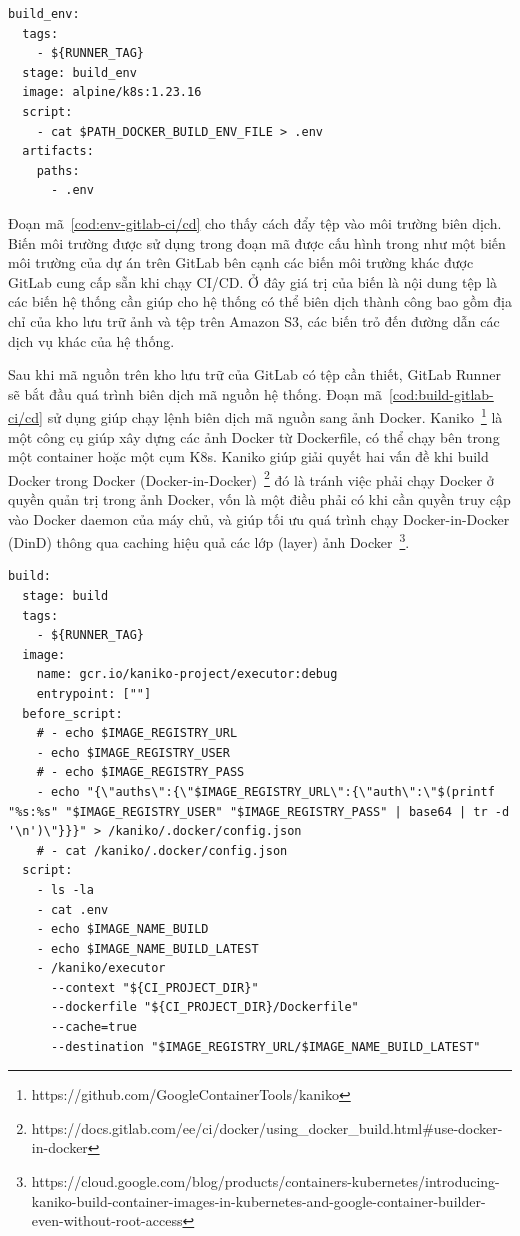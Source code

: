\begin{lstlisting}[style=yaml, caption={Đoạn mã cấu hình cài đặt biến môi trường cho GitLab Runner.}, label={cod:env-gitlab-ci/cd},  captionpos=b]
build_env:
  tags:
    - ${RUNNER_TAG}
  stage: build_env
  image: alpine/k8s:1.23.16
  script:
    - cat $PATH_DOCKER_BUILD_ENV_FILE > .env
  artifacts:
    paths:
      - .env
\end{lstlisting}

Đoạn mã~\ref{cod:env-gitlab-ci/cd} cho thấy cách đẩy tệp  vào môi trường biên dịch.
Biến môi trường  được sử dụng trong đoạn mã được cấu hình trong như một biến môi trường của dự án trên GitLab bên cạnh các biến môi trường khác được GitLab cung cấp sẵn khi chạy CI/CD.
Ở đây giá trị của biến là nội dung tệp  là các biến hệ thống cần giúp cho hệ thống có thể biên dịch thành công bao gồm địa chỉ của kho lưu trữ ảnh và tệp trên Amazon S3, các biến trỏ đến đường dẫn các dịch vụ khác của hệ thống.

Sau khi mã nguồn trên kho lưu trữ của GitLab có tệp  cần thiết, GitLab Runner sẽ bắt đầu quá trình biên dịch mã nguồn hệ thống. Đoạn mã~\ref{cod:build-gitlab-ci/cd} sử dụng  giúp chạy lệnh biên dịch mã nguồn sang ảnh Docker.
Kaniko~\footnote{https://github.com/GoogleContainerTools/kaniko} là một công cụ giúp xây dựng các ảnh Docker từ Dockerfile, có thể chạy bên trong một container hoặc một cụm K8s.
Kaniko giúp giải quyết hai vấn đề khi build Docker trong Docker (Docker-in-Docker)~\footnote{https://docs.gitlab.com/ee/ci/docker/using\_docker\_build.html\#use-docker-in-docker} đó là tránh việc phải chạy Docker ở quyền quản trị trong ảnh Docker, vốn là một điều phải có khi cần quyền truy cập vào Docker daemon của máy chủ, và giúp tối ưu quá trình chạy Docker-in-Docker (DinD) thông qua caching hiệu quả các lớp (layer) ảnh Docker~\footnote{https://cloud.google.com/blog/products/containers-kubernetes/introducing-kaniko-build-container-images-in-kubernetes-and-google-container-builder-even-without-root-access}.

\begin{lstlisting}[style=yaml, caption={Đoạn mã cấu hình quá trình biên dịch mã cho GitLab Runner.}, label={cod:build-gitlab-ci/cd},  captionpos=b]
build:
  stage: build
  tags:
    - ${RUNNER_TAG}
  image:
    name: gcr.io/kaniko-project/executor:debug
    entrypoint: [""]
  before_script:
    # - echo $IMAGE_REGISTRY_URL
    - echo $IMAGE_REGISTRY_USER
    # - echo $IMAGE_REGISTRY_PASS
    - echo "{\"auths\":{\"$IMAGE_REGISTRY_URL\":{\"auth\":\"$(printf "%s:%s" "$IMAGE_REGISTRY_USER" "$IMAGE_REGISTRY_PASS" | base64 | tr -d '\n')\"}}}" > /kaniko/.docker/config.json
    # - cat /kaniko/.docker/config.json
  script:
    - ls -la
    - cat .env
    - echo $IMAGE_NAME_BUILD
    - echo $IMAGE_NAME_BUILD_LATEST
    - /kaniko/executor
      --context "${CI_PROJECT_DIR}"
      --dockerfile "${CI_PROJECT_DIR}/Dockerfile"
      --cache=true
      --destination "$IMAGE_REGISTRY_URL/$IMAGE_NAME_BUILD_LATEST"
\end{lstlisting}


